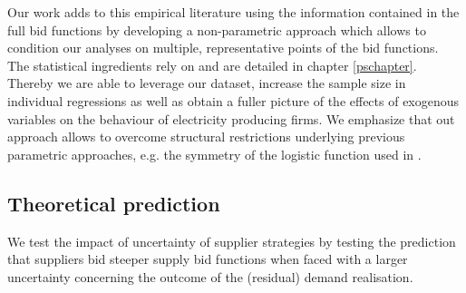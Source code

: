Our work adds to this empirical literature using the information contained in the full bid functions 
by developing a non-parametric approach which allows to condition our analyses on multiple, representative points of the bid functions. The statistical ingredients rely on \cite{ramsaysilverman2005functional} and are detailed in chapter \ref{pschapter}.
Thereby we are able to leverage our dataset, increase the sample size in individual regressions as well as obtain a fuller picture of the effects of exogenous variables on the behaviour of electricity producing firms. We emphasize that out approach allows to overcome structural restrictions underlying previous parametric approaches, e.g. the symmetry of the logistic function used in \cite{pw2002etude}.



\subsection{Theoretical prediction}
\label{intropredict}


We test the impact of uncertainty of supplier strategies by testing the prediction that suppliers bid steeper supply bid functions when faced with a larger uncertainty concerning the outcome of the (residual) demand realisation.

